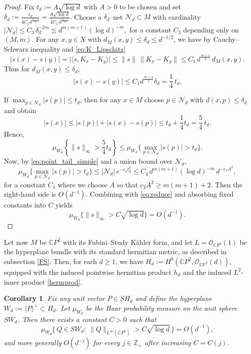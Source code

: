 \documentclass [11pt]{amsart}
\newtheorem {corollary}[theorem]{Corollary}
\theoremstyle{remark}
\numberwithin{equation}{section}
\numberwithin{theorem}{section}
\begin{document}
\begin{proof}
Fix $t_d:=A\sqrt{\log d}$ with $A>0$ to be chosen and set
\( \displaystyle{
\delta_d:=\frac{t_d}{4C_1 d^{\frac{m+1}{2}}}
=\frac{A\sqrt{\log d}}{4C_1\,d^{\frac{m+1}{2}}}. }
\)
Choose a $\delta_d$--net $\mathcal{N}_d\subset M$ with cardinality
\( \displaystyle{
|\mathcal{N}_d|\le C_3\,\delta_d^{-2m}
\lesssim d^{m(m+1)}(\log d)^{-m},}
\)
for a constant $C_3$ depending only on $(M,m)$. For any $x,y\in X$ with $d_M(x, y)\le \delta_d\le d^{-1/2}$, we have by Cauchy--Schwarz inequality and \eqref{eq:K_Lipschitz}
\[
|s(x)-s(y)|=\big|\langle s, K_x-K_y\rangle \big|\le \|s\|\,\|K_x-K_y\|\le C_1\,d^{\frac{m+1}{2}}\,d_M(x,y).
\]
Thus for $d_M( x, y)\le\delta_d$,
\begin{equation}\label{eq:osc}
|s(x)-s(y)|\le C_1 d^{\frac{m+1}{2}}\delta_d = \frac14\,t_d.
\end{equation}

\smallskip
\noindent
If $\max_{p\in\mathcal{N}_d}|s(p)|\le t_d$, then for any $x\in M$
choose $p\in\mathcal{N}_d$ with $d(x,p)\le\delta_d$ and obtain
\[
|s(x)|\le |s(p)|+|s(x)-s(p)|
\le t_d+\frac14 t_d=\frac54\,t_d.
\]
Hence,
\begin{equation}\label{eq:reduce}
\mu_{W_d}\left\{\|s\|_\infty>\frac{5}{4} t_d\right\}\le \mu_{W_d}\Big\{\max_{p\in\mathcal{N}_d}|s(p)|>t_d\Big\}.
\end{equation}
Now, by \eqref{eq:point_tail_simple} and a union bound over $\mathcal{N}_d$,
\[
\mu_{W_d}\Big\{\max_{p\in\mathcal{N}_d}|s(p)|>t_d\Big\}
\le |\mathcal{N}_d|\,e^{-c_2 t_d^2}
\le C_4\,d^{m(m+1)}(\log d)^{-m}\,d^{-c_2A^2},
\]
for a constant $C_4$ where we choose $A$ so that $c_2A^2\ge m(m+1)+2$. Then the right-hand side is $O(d^{-1})$. 
Combining with \eqref{eq:reduce} and absorbing fixed constants into $C$ yields
\[
\mu_{W_d}\{\|s\|_\infty>C\sqrt{\log d}\}=O(d^{-1}).
\]

\end{proof}


Let now $M$ be $\mathbb{C}P^2$ with its Fubini--Study K\"ahler form, and let
$L=\mathcal{O}_{\mathbb{C}P^2}(1)$ be the hyperplane bundle with its standard hermitian metric, as described in subsection \ref{FS}.
Then, for each $d\ge 1$, we have
$H_d:=H^0(\mathbb{C}P^2,\mathcal{O}_{\mathbb{CP}^2}(d))$,
equipped with the induced pointwise hermitian product $h_{d}$ and the induced $L^2$-inner product \eqref{hermprod}.


\begin{corollary}
\label{cor:CP2_real_hyperplane}
Fix any unit vector $P\in SH_d$ and define the hyperplane
$W_d:=\langle P\rangle^{\perp} \subset H_d$.  Let $\mu_{W_d}$ be the Haar probability measure on the unit sphere $SW_d$.
Then there exists a constant $C>0$ such that
\[
\mu_{W_d}\Big\{\,Q\in SW_d:\ \|Q\|_{L^\infty(\mathbb{C}P^2)}
> C\sqrt{\log d}\,\Big\}
=O(d^{-1}),
\]
and more generally $O(d^{-j})$ for every $j\in\mathbb{Z}_+$ after increasing $C=C(j)$.
\end{corollary}
\end{document}
